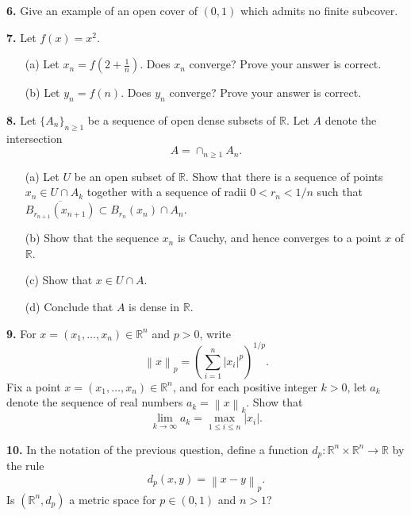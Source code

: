 \documentclass[12pt]{article}
\newcommand{\norm}[1]{\left\lVert#1\right\rVert}
\begin{document}
\medskip

\noindent \textbf{6.} Give an example of an open cover of $(0,1)$ which admits no finite subcover. 

\medskip

\noindent \textbf{7.} Let $f(x) = x^2$. 
\begin{enumerate}
\item[(a)] Let $x_n = f(2 + \tfrac{1}{n})$. Does $x_n$ converge? Prove your answer is correct. 
\item[(b)] Let $y_n = f(n)$. Does $y_n$ converge? Prove your answer is correct. 
\end{enumerate}

\medskip


\noindent \textbf{8.} Let $\{A_n\}_{n \geqslant 1}$ be a sequence of open dense subsets of $\mathbb{R}$. Let $A$ denote the intersection 
\[
A = \cap_{n \geqslant 1} A_n.
\]
\begin{enumerate}
\item[(a)] Let $U$ be an open subset of $\mathbb{R}$. Show that there is a sequence of points $x_n \in U \cap A_k$ together with a sequence of radii $0 < r_n < 1/n$ such that $\overline{B_{r_{n+1}}(x_{n+1})} \subset B_{r_n}(x_n) \cap A_n$.
\item[(b)] Show that the sequence $x_n$ is Cauchy, and hence converges to a point $x$ of $\mathbb{R}$. 
\item[(c)] Show that $x \in U \cap A$. 
\item[(d)] Conclude that $A$ is dense in $\mathbb{R}$. 
\end{enumerate}


\noindent \textbf{9.} For $x = (x_1, \ldots, x_n) \in \mathbb{R}^n$ and $p > 0$, write 
\[
\norm{x}_p = \left(\sum_{i=1}^n |x_i|^p\right)^{1/p}.
\]
Fix a point $x = (x_1, \ldots, x_n) \in \mathbb{R}^n$, and for each positive integer $k > 0$, let $a_k$ denote the sequence of real numbers $a_k = \norm{x}_{k}$.  Show that 
\[
\lim_{k \to \infty} a_k = \max_{1 \leqslant i \leqslant n} |x_i|. 
\]

\medskip 

\noindent\textbf{10.} In the notation of the previous question, define a function $d_p : \mathbb{R}^n \times \mathbb{R}^n \to \mathbb{R}$ by the rule 
\[
d_p(x,y) = \norm{x - y}_p.
\]
Is $(\mathbb{R}^n, d_p)$ a metric space for $p \in (0,1)$ and $n > 1$? 
\end{document}
